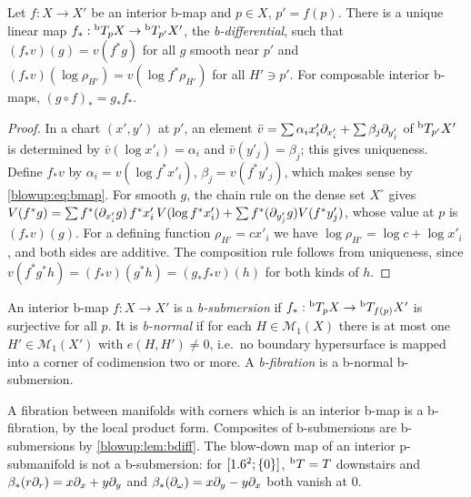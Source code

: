 \begin{lemma}\label{blowup:lem:bdiff}
Let $f:X\to X'$ be an interior b-map and $p\in X$, $p'=f(p)$. There is a unique linear map
$f_*:{}^{\mathrm{b}}T_pX\to{}^{\mathrm{b}}T_{p'}X'$, the \emph{b-differential}, such that $(f_*v)(g)=v(f^*g)$ for all
$g$ smooth near $p'$ and $(f_*v)(\log\rho_{H'})=v(\log f^*\rho_{H'})$ for all $H'\ni p'$.
For composable interior b-maps, $(g\circ f)_*=g_*f_*$.
\end{lemma}
\begin{proof}
In a chart $(x',y')$ at $p'$, an element $\bar v=\sum\alpha_ix'_i\partial_{x'_i}+\sum\beta_j\partial_{y'_j}$
of ${}^{\mathrm{b}}T_{p'}X'$ is determined by $\bar v(\log x'_i)=\alpha_i$ and $\bar v(y'_j)=\beta_j$; this
gives uniqueness. Define $f_*v$ by $\alpha_i=v(\log f^*x'_i)$, $\beta_j=v(f^*y'_j)$, which
makes sense by \eqref{blowup:eq:bmap}. For smooth $g$, the chain rule on the dense set
$X^\circ$ gives $V(f^*g)=\sum f^*(\partial_{x'_i}g)\,f^*x'_i\,V(\log f^*x'_i)+\sum
f^*(\partial_{y'_j}g)V(f^*y'_j)$, whose value at $p$ is $(f_*v)(g)$. For a defining function
$\rho_{H'}=cx'_i$ we have $\log\rho_{H'}=\log c+\log x'_i$, and both sides are additive. The
composition rule follows from uniqueness, since $v(f^*g^*h)=(f_*v)(g^*h)=(g_*f_*v)(h)$ for
both kinds of $h$.
\end{proof}

\begin{definition}\label{blowup:def:bfib}
An interior b-map $f:X\to X'$ is a \emph{b-submersion} if $f_*:{}^{\mathrm{b}}T_pX\to{}^{\mathrm{b}}T_{f(p)}X'$ is
surjective for all $p$. It is \emph{b-normal} if for each $H\in\mathcal M_1(X)$ there is at
most one $H'\in\mathcal M_1(X')$ with $e(H,H')\ne0$, i.e.\ no boundary hypersurface is mapped
into a corner of codimension two or more. A \emph{b-fibration} is a b-normal
b-submersion.
\end{definition}

A fibration between manifolds with corners which is an interior b-map is a b-fibration,
by the local product form. Composites of b-submersions are b-submersions by
\cref{blowup:lem:bdiff}. The blow-down map of an interior p-submanifold is not a
b-submersion: for $[1.6^2;\{0\}]$, ${}^{\mathrm{b}}T=T$ downstairs and $\beta_*(r\partial_r)=x\partial_x+y\partial_y$ and
$\beta_*(\partial_\omega)=x\partial_y-y\partial_x$ both vanish at $0$.

